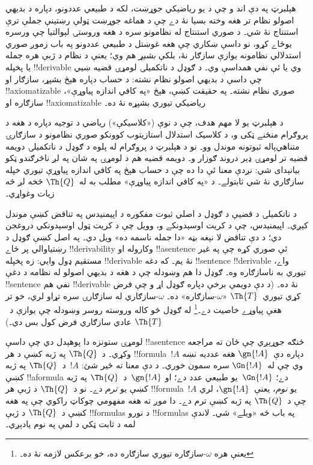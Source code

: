 \documentclass[../../../include/open-logic-section]{subfiles}
\begin{document}


هېلبرټ په دې اند و چې د يو رياضيکي جوړښت، لکه د طبيعي عددونو، دپاره
د بديهي اصولو نظام تر هغه وخته بسيا نۀ دے چې د هماغه جوړښت ټولې
رښتينې جملې ترې استنتاج نۀ شي۔ د صوري استنتاج له نظامونو سره د هغه
وروستۍ لېوالتيا چې ورسره يوځاے کړو، نو داسې ښکاري چې هغه غوښتل د
طبيعي عددونو په باب زموږ صوري استدلالي نظامونه يوازې سازګار نۀ، بلکې
\emph{بشپړ} هم وي؛ يعنې د نظام د ژبې هره جمله يا پخپله !!{derivable}
وي يا ئې نفي همداسې وي۔ د ګوډل د ناتکميلۍ لومړۍ قضيه ښيي چې
داسې د بديهي اصولو نظام نشته: د حساب دپاره هېڅ بشپړ، سازګار او
!!{axiomatizable} صوري نظام نشته۔ په حقيقت کښې، هېڅ «په کافي اندازه
پياوړې»، سازګاره او !!{axiomatizable} رياضيکي تيوري بشپړه نۀ ده۔

د هېلبرټ يو لا مهم هدف، چې د نوې («کلاسيکې») رياضي د توجيه دپاره
د هغه د پروګرام منځنے ټکی و، د کلاسيک استدلال استازيتوب کوونکو صوري
نظامونو د سازګارۍ متناهي‌پاله ثبوتونه موندل وو۔ نو د هېلبرټ د
پروګرام له پلوه د ګوډل د ناتکميلۍ دويمه قضيه تر لومړۍ ډېر دروند ګوزار
و۔ دويمه قضيه هم د لومړۍ په شان په لږ ناڅرګندو ټکو بيانېدای شي:
نږدې معنا ئې دا ده چې د حساب هېڅ په کافي اندازه پياوړې تيوري خپله
سازګاري نۀ شي ثابتولے۔ د «په کافي اندازه پياوړې» مطلب به له~$\Th{Q}$
څخه لږ څه زيات وغواړي۔

د ناتکميلۍ د قضيې د ګوډل د اصلي ثبوت مفکوره د اپيمنيدس په تناقض
کښې موندل کېږي۔ اپيمنيدس، چې د کريت اوسېدونکے و، وويل چې د کريت
ټول اوسېدونکي دروغجن دي؛ د دې تناقض لا نېغه بڼه «دا جمله ناسمه ده»
ويل دي۔ په اصل کښې ګوډل د رښتياوالي پر ځاے !!{derivability} وکاروله
او !!a{sentence} ئې صوري کړه چې په غير مستقيم ډول وايي: زه پخپله
!!{derivable} نۀ يم۔ که دغه !!{sentence} !!{derivable} واے، تيوري به
ناسازګاره وه۔ ګوډل دا هم وښودله چې د هغه د بديهي اصولو له نظامه د
دغې !!{sentence} نفي هم !!{derivable} نۀ ده۔ (د دې دويمې برخې دپاره
ګوډل اړ و چې فرض کړي تيوري~$\Th{T}$ «$\omega$-سازګاره» ده۔
$\omega$-سازګاري له سازګارۍ سره تړاو لري، خو تر هغې پياوړے خاصيت
دے۔\footnote{يعنې هره $\omega$-سازګاره تيوري سازګاره ده، خو
برعکس لازمه نۀ ده۔} له ګوډل څو کاله وروسته
روسر وښودله چې يوازې د~$\Th{T}$ عادي سازګاري فرض کول بس دي۔)

لومړۍ ستونزه دا پوهېدل دي چې داسې !!a{sentence} څنګه جوړېږي چې
ځان ته مراجعه وکړي۔ د~$\Th{Q}$ په ژبه کښې د هر !!{formula}~$!A$
دپاره دې~$\gn{!A}$ هغه عدديه نښه وي چې له~$\Gn{!A}$ سره سمون خوري۔
د دې معنا ته ځير شئ: $!A$~د~$\Th{Q}$ په ژبه کښې !!a{formula} دے؛
$\Gn{!A}$~يو طبيعي عدد دے؛ او $\gn{!A}$~د~$\Th{Q}$ په ژبه کښې يو
\emph{ترم} دے۔ نو د~$\Th{Q}$ د ژبې هر !!{formula}~$!A$ يو
\emph{نوم}، يعنې~$\gn{!A}$، لري چې د~$\Th{Q}$ په ژبه کښې ترم
دے۔ دا موږ ته
هغه مفهومي چوکاټ راکوي چې په هغه کښې د~$\Th{Q}$ د ژبې
!!{formula}s د نورو !!{formula}s په باب څه «ويلے» شي۔ لاندې لمه
د ثابت ټکي د لمې په نوم يادېږي۔
\end{document}
